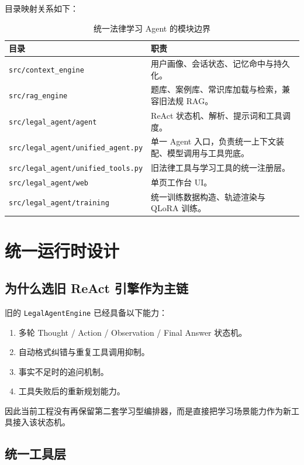 \documentclass[12pt]{ctexart}
\begin{document}
目录映射关系如下：

\begin{table}[H]
\centering
\begin{tabular}{p{}p{}}
\toprule
目录 & 职责 \\
\midrule
\texttt{src/context\_engine} & 用户画像、会话状态、记忆命中与持久化。 \\
\texttt{src/rag\_engine} & 题库、案例库、常识库加载与检索，兼容旧法规 RAG。 \\
\texttt{src/legal\_agent/agent} & ReAct 状态机、解析、提示词和工具调度。 \\
\texttt{src/legal\_agent/unified\_agent.py} & 单一 Agent 入口，负责统一上下文装配、模型调用与工具兜底。 \\
\texttt{src/legal\_agent/unified\_tools.py} & 旧法律工具与学习工具的统一注册层。 \\
\texttt{src/legal\_agent/web} & 单页工作台 UI。 \\
\texttt{src/legal\_agent/training} & 统一训练数据构造、轨迹渲染与 QLoRA 训练。 \\
\bottomrule
\end{tabular}
\caption{统一法律学习 Agent 的模块边界}
\end{table}

\section{统一运行时设计}

\subsection{为什么选旧 ReAct 引擎作为主链}

旧的 \texttt{LegalAgentEngine} 已经具备以下能力：

\begin{enumerate}
  \item 多轮 Thought / Action / Observation / Final Answer 状态机。
  \item 自动格式纠错与重复工具调用抑制。
  \item 事实不足时的追问机制。
  \item 工具失败后的重新规划能力。
\end{enumerate}

因此当前工程没有再保留第二套学习型编排器，而是直接把学习场景能力作为新工具接入该状态机。

\subsection{统一工具层}
\end{document}
